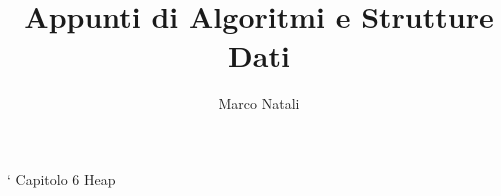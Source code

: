 \documentclass[a4paper, 11pt]{book}
\begin{document}
\title{Appunti di Algoritmi e Strutture Dati}
\author{Marco Natali}
\maketitle
\tableofcontents
`
 Capitolo 6 Heap
\end{document}
